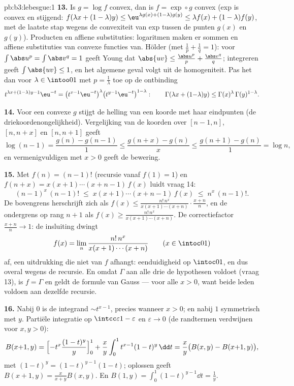\begin{solution}{pb:b3:lebesgue:1}
\textbf{13.} Is $g = \log f$ convex, dan is $f = \exp\circ g$
convex (exp is convex en stijgend: $f(\lambda x + (1-\lambda)y)
\leq \eu^{\lambda g(x) + (1-\lambda)g(y)} \leq \lambda f(x) +
(1-\lambda)f(y)$, met de laatste stap wegens de convexiteit van
exp tussen de punten $g(x)$ en $g(y)$). Producten en affiene
substituties: logaritmen maken er sommen en affiene substituties
van convexe functies van. Hölder (met $\frac1p + \frac1q = 1$):
voor $\int\abs u^p = \int\abs v^q = 1$ geeft Young dat $\abs{uv}
\leq \frac{\abs u^p}p + \frac{\abs v^q}q$; integreren geeft
$\int\abs{uv} \leq 1$, en het algemene geval volgt uit de
homogeniteit. Pas het dan voor $\lambda \in \intoo01$ met $p =
\frac1\lambda$ toe op de ontbinding
\[
t^{\lambda x + (1-\lambda)y - 1}\eu^{-t}
= \bigl(t^{x-1}\eu^{-t}\bigr)^{\lambda}
\bigl(t^{y-1}\eu^{-t}\bigr)^{1-\lambda} :
\qquad
\Gamma(\lambda x + (1{-}\lambda)y) \leq
\Gamma(x)^\lambda\,\Gamma(y)^{1-\lambda} .
\]

\textbf{14.} Voor een convexe $g$ stijgt de helling van een koorde
met haar eindpunten (de driekoordenongelijkheid). Vergelijking van
de koorden over $[n-1, n]$, $[n, n+x]$ en $[n, n+1]$ geeft
\[
\log(n-1) = \frac{g(n) - g(n-1)}1 \leq
\frac{g(n+x) - g(n)}x \leq \frac{g(n+1) - g(n)}1 = \log n,
\]
en vermenigvuldigen met $x > 0$ geeft de bewering.

\textbf{15.} Met $f(n) = (n-1)!$ (recursie vanaf $f(1) = 1$) en
$f(n + x) = x(x+1)\cdots(x+n-1)\,f(x)$ luidt vraag 14:
\[
(n-1)^x\,(n-1)! \;\leq\; x(x+1)\cdots(x+n-1)\,f(x)
\;\leq\; n^x\,(n-1)! .
\]
De bovengrens herschrijft zich als $f(x) \leq
\frac{n!\,n^x}{x(x+1)\cdots(x+n)}\cdot\frac{x+n}n$, en de
ondergrens op rang $n+1$ als $f(x) \geq
\frac{n!\,n^x}{x(x+1)\cdots(x+n)}$. De correctiefactor
$\frac{x+n}n \to 1$: de insluiting dwingt
\[
f(x) = \lim_n\frac{n!\,n^x}{x(x+1)\cdots(x+n)}
\qquad (x \in \intoc01)
\]
af, een uitdrukking die niet van $f$ afhangt: eenduidigheid op
$\intoc01$, en dus overal wegens de recursie. En omdat $\Gamma$
aan alle drie de hypothesen voldoet (vraag 13), is $f = \Gamma$ en
geldt de formule van Gauss --- voor alle $x > 0$, want beide leden
voldoen aan dezelfde recursie.

\textbf{16.} Nabij $0$ is de integrand $\sim t^{x-1}$,
 precies wanneer $x > 0$; en nabij $1$ symmetrisch
met $y$. Partiële integratie op $\intcc\varepsilon{1-\varepsilon}$
en $\varepsilon \to 0$ (de randtermen verdwijnen voor $x, y > 0$):
\[
B(x{+}1, y) = \Bigl[-t^x\frac{(1-t)^y}y\Bigr]_0^1 +
\frac xy\int_0^1t^{x-1}(1-t)^y\,\dd t
= \frac xy\bigl(B(x, y) - B(x{+}1, y)\bigr),
\]
met $(1-t)^y = (1-t)^{y-1}(1 - t)$; oplossen geeft $B(x+1, y) =
\frac{x}{x+y}B(x, y)$. En $B(1, y) = \int_0^1(1-t)^{y-1}\dd t =
\frac1y$.


\end{solution}
